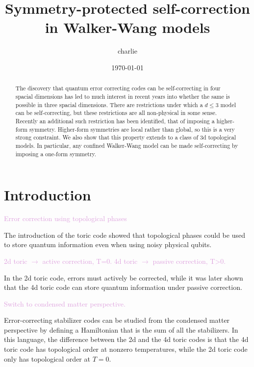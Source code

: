 \documentclass[twocolumn, longbibliography]{revtex4-2}
\newcommand{\outline}[1]{\textcolor{Plum}{#1}}
\begin{document}
	
\title{Symmetry-protected self-correction in Walker-Wang models}
\author{charlie}
	
\begin{abstract}
The discovery that quantum error correcting codes can be self-correcting in four spacial dimensions has led to much interest in recent years into whether the same is possible in three spacial dimensions. There are restrictions under which a $d\leq 3$ model can be self-correcting, but these restrictions are all non-physical in some sense. Recently an additional such restriction has been identified, that of imposing a higher-form symmetry. Higher-form symmetries are local rather than global, so this is a very strong constraint. 
We also show that this property extends to a class of 3d topological models. In particular, any confined Walker-Wang model can be made self-correcting by imposing a one-form symmetry. 
\end{abstract}
	
\date{\today}
	
\maketitle
	
\section{Introduction}
	
\outline{Error correction using topological phases}
	
The introduction of the toric code showed that topological phases could be used to store quantum information even when using noisy physical qubits. 
	
\outline{2d toric $\longrightarrow$ active correction, T=0. 4d toric $\longrightarrow$ passive correction, T>0.}
	
In the 2d toric code, errors must actively be corrected, while it was later shown that the 4d toric code can store quantum information under passive correction.
	
\outline{Switch to condensed matter perspective.}
	
Error-correcting stabilizer codes can be studied from the condensed matter perspective by defining a Hamiltonian that is the sum of all the stabilizers. In this language, the difference between the 2d and the 4d toric codes is that the 4d toric code has topological order at nonzero temperatures, while the 2d toric code only has topological order at $T=0$.
	
\end{document}
